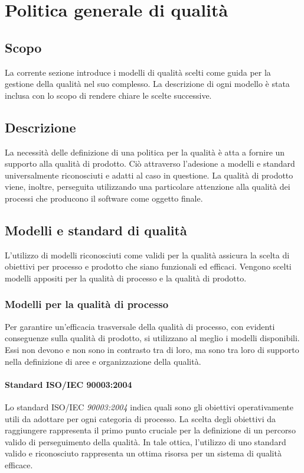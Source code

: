 \documentclass[12pt,a4paper]{article}
\begin{document}
\newpage

\section{Politica generale di qualità}
\subsection{Scopo}
La corrente sezione introduce i modelli di qualità scelti come guida per la gestione della qualità nel suo complesso. La descrizione di ogni modello è stata inclusa con lo scopo di rendere chiare le scelte successive.
\subsection{Descrizione}
La necessità delle definizione di una politica per la qualità è atta a fornire un supporto alla qualità di prodotto. Ciò attraverso l'adesione a modelli e standard universalmente riconosciuti e adatti al caso in questione. La qualità di prodotto viene, inoltre, perseguita utilizzando una particolare attenzione alla qualità dei processi che producono il software come oggetto finale.
\subsection{Modelli e standard di qualità}
L'utilizzo di modelli riconosciuti come validi per la qualità assicura la scelta di obiettivi per processo e prodotto che siano funzionali ed efficaci. Vengono scelti modelli appositi per la qualità di processo e la qualità di prodotto.
\subsubsection{Modelli per la qualità di processo}
Per garantire un'efficacia trasversale della qualità di processo, con evidenti conseguenze sulla qualità di prodotto, si utilizzano al meglio i modelli disponibili. Essi non devono e non sono  in contrasto tra di loro, ma sono tra loro di supporto nella definizione di aree e organizzazione della qualità.
\paragraph{Standard ISO/IEC 90003:2004}
Lo standard ISO/IEC \textit{90003:2004} indica quali sono gli obiettivi operativamente utili da adottare per ogni categoria di processo. La scelta degli obiettivi da raggiungere rappresenta il primo punto cruciale per la definizione di un percorso valido di perseguimento della qualità. In tale ottica, l'utilizzo di uno standard valido e riconosciuto rappresenta un ottima risorsa per un sistema di qualità efficace.
\end{document}
